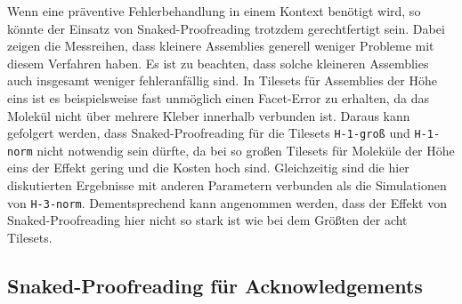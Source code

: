 Wenn eine präventive Fehlerbehandlung in einem Kontext benötigt wird, so könnte der Einsatz von Snaked-Proofreading trotzdem gerechtfertigt sein. Dabei zeigen die Messreihen, dass kleinere Assemblies generell weniger Probleme mit diesem Verfahren haben. Es ist zu beachten, dass solche kleineren Assemblies auch insgesamt weniger fehleranfällig sind. In Tilesets für Assemblies der Höhe eins ist es beispielsweise fast unmöglich einen Facet-Error zu erhalten, da das Molekül nicht über mehrere Kleber innerhalb verbunden ist. Daraus kann gefolgert werden, dass Snaked-Proofreading für die Tilesets \texttt{H-1-groß} und \texttt{H-1-norm} nicht notwendig sein dürfte, da bei so großen Tilesets für Moleküle der Höhe eins der Effekt gering und die Kosten hoch sind. Gleichzeitig sind die hier diskutierten Ergebnisse mit anderen Parametern verbunden als die Simulationen von \texttt{H-3-norm}. Dementsprechend kann angenommen werden, dass der Effekt von Snaked-Proofreading hier nicht so stark ist wie bei dem Größten der acht Tilesets.

\subsection{Snaked-Proofreading für Acknowledgements}

